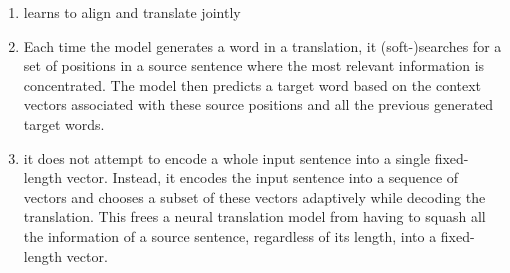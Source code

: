 \begin{enumerate}
    \item learns to align and translate jointly
    \hfill \cite{adv-ml-tech/paper/arxiv.org/1409.0473}

    \item Each time the model generates a word in a translation, it (soft-)searches for a set of positions in a source sentence where the most relevant information is concentrated. 
    The model then predicts a target word based on the context vectors associated with these source positions and all the previous generated target words.
    \hfill \cite{adv-ml-tech/paper/arxiv.org/1409.0473}

    \item it does not attempt to encode a whole input sentence into a single fixed-length vector.
    Instead, it encodes the input sentence into a sequence of vectors and chooses a subset of these vectors adaptively while decoding the translation. 
    This frees a neural translation model from having to squash all the information of a source sentence, regardless of its length, into a fixed-length vector.
    \hfill \cite{adv-ml-tech/paper/arxiv.org/1409.0473}
\end{enumerate}











